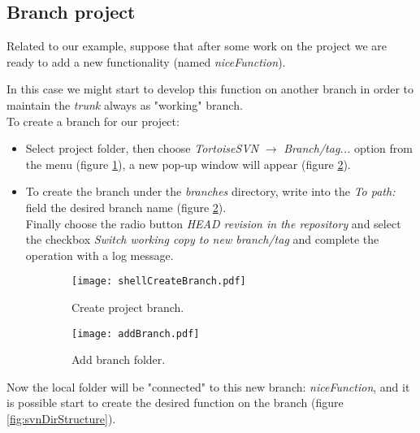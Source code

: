 \subsection{Branch project}
\label{subsection:branchProject}

Related to our example, suppose that after some work on the project we are ready to add a new functionality (named \textit{niceFunction}).

In this case we might start to develop this function on another branch in order to maintain the \textit{trunk} always as "working" branch.\\


To create a branch for our project:
\begin{itemize}

    \item Select project folder, then choose \textit{TortoiseSVN} $\rightarrow$ \textit{Branch/tag...} option from the menu (figure \ref{fig:shellCreateBranch}), a new pop-up window will appear (figure \ref{fig:addBranch}).
    
    \item To create the branch under the \textit{branches} directory, write into the \textit{To path:} field the desired branch name (figure \ref{fig:addBranch}).\\
    Finally choose the radio button \textit{HEAD revision in the repository} and select the checkbox \textit{Switch working copy to new branch/tag} and complete the operation with a log message.
    
\end{itemize}



\begin{figure}[htbp]
\begin{subfigure}{0.48\textwidth}
  \centering
    \texttt{[image: shellCreateBranch.pdf]}
    \caption{Create project branch.}
    \label{fig:shellCreateBranch}
\end{subfigure}%
\begin{subfigure}{0.48\textwidth}
  \centering
    \texttt{[image: addBranch.pdf]}
    \caption{Add branch folder.}
    \label{fig:addBranch}
\end{subfigure}%
\caption{}
\label{fig:switchMakeBranch}
\end{figure}


Now the local folder will be "connected" to this new branch: \textit{niceFunction}, and it is possible start to create the desired function on the branch (figure \ref{fig:svnDirStructure}).














